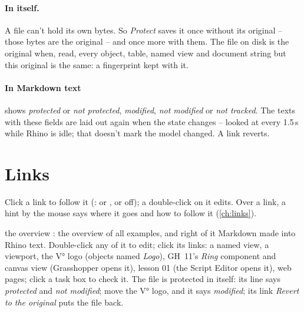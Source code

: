 \paragraph{In itself.} A file can't hold its own bytes. So \emph{Protect} saves it once without its original -- those
bytes are the original -- and once more with them. The file on disk is the original when, read, every object, table,
named view and document string but this original is the same: a fingerprint kept with it.

\paragraph{In Markdown text}  shows \emph{protected} or \emph{not protected}, 
\emph{modified}, \emph{not modified} or \emph{not tracked}. The texts with these fields are laid out again when the state
changes -- looked at every 1.5\,s while Rhino is idle; that doesn't mark the model changed. A link
 reverts.

\section{Links}

Click a link to follow it (: or , or off); a
double-click on it edits. Over a link, a hint by the mouse says where it goes and how to follow it (\cref{ch:links}).

\begin{lesson}{the overview}
: the overview of all examples, and right of it Markdown made into Rhino text. Double-click
any of it to edit; click its links: a named view, a viewport, the V° logo (objects named \emph{Logo}), GH~11's \emph{Ring} component and canvas
view (Grasshopper opens it), lesson 01 (the Script Editor opens it), web pages; click a task box to check it. The file is protected in itself: its
line says \emph{protected} and \emph{not modified}; move the V° logo, and it says \emph{modified}; its link
\emph{Revert to the original} puts the file back.
\end{lesson}
